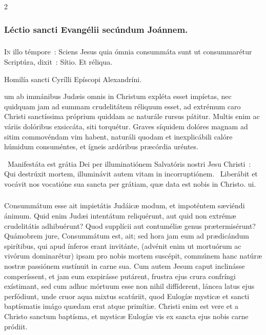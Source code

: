 \documentclass[9pt,twoside]{extarticle}
\begin{document}
\begin{multicols}{2}
\subsubsection*{\center Léctio sancti Evangélii secúndum Joánnem.}
\subsubsection*{\center {}}
\lettrine{I}n illo témpore~: Sciens Jesus quia ómnia consummáta sunt ut consummarétur Scriptúra, dixit~: Sítio. Et réliqua.

\begin{center}Homilía sancti Cyrílli Epíscopi Alexandríni.\\
\end{center}
um ab immánibus Judæis omnis in Christum expléta esset impíetas, nec quidquam jam ad summam crudelitátem réliquum esset, ad extrémum caro Christi sanctíssima próprium quiddam ac naturále rursus pátitur. Multis enim ac váriis dolóribus exsiccáta, siti torquétur. Graves síquidem dolóres magnam ad sitim commovéndam vim habent, naturáli quodam et inexplicábili calóre húmidum consuméntes, et ígneis ardóribus præcórdia uréntes.

\begin{tightlist}{}
\item {}~Manifestáta est grátia Dei per illuminatiónem Salvatóris nostri Jesu Christi~: \textred{*} Qui destrúxit mortem, illuminávit autem vitam in incorruptiónem. ~Liberábit et vocávit nos vocatióne sua sancta per grátiam, quæ data est nobis in Christo. ui.
\end{tightlist}

\subsubsection*{\center {}}
\lettrine{C}onsummátum esse ait impietátis Judáicæ modum, et impoténtem sæviéndi ánimum. Quid enim Judæi intentátum reliquérunt, aut quid non extrémæ crudelitátis adhibuérunt? Quod supplícii aut contuméliæ genus prætermisérunt? Quámobrem jure, Consummátum est, ait; sed hora jam eum ad prædicándum spirítibus, qui apud ínferos erant invitánte, (advénit enim ut mortuórum ac vivórum dominarétur) ipsam pro nobis mortem suscépit, commúnem hanc natúræ nostræ passiónem sustínuit in carne sua. Cum autem Jesum caput inclinásse comperíssent, et jam eum exspirásse putárent, frustra ejus crura confríngi exístimant, sed cum adhuc mórtuum esse non nihil diffíderent, láncea latus ejus perfódiunt, unde cruor aqua mixtus scatúriit, quod Eulogíæ mysticæ et sancti baptísmatis imágo quædam erat atque primítiæ. Christi enim est vere et a Christo sanctum baptísma, et mysticæ Eulogíæ vis ex sancta ejus nobis carne pródiit.


\end{multicols}
\end{document}
